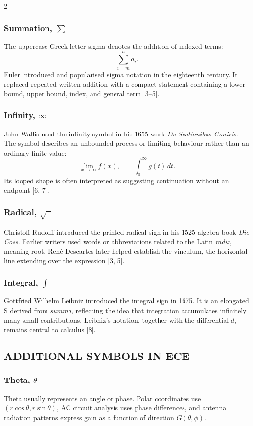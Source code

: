\begin{multicols}{2}
  \subsubsection*{Summation, $\sum$}
  The uppercase Greek letter sigma denotes the addition of indexed terms:
  \[
    \sum_{i=m}^{n}a_i.
  \]
  Euler introduced and popularised sigma notation in the eighteenth century. It replaced repeated written addition with a compact statement containing a lower bound, upper bound, index, and general term [3--5].

  \subsubsection*{Infinity, $\infty$}
  John Wallis used the infinity symbol in his 1655 work \textit{De Sectionibus Conicis}. The symbol describes an unbounded process or limiting behaviour rather than an ordinary finite value:
  \[
    \lim_{x\to\infty}f(x), \qquad
    \int_{0}^{\infty}g(t)\,dt.
  \]
  Its looped shape is often interpreted as suggesting continuation without an endpoint [6, 7].

  \subsubsection*{Radical, $\sqrt{\phantom{x}}$}
  Christoff Rudolff introduced the printed radical sign in his 1525 algebra book \textit{Die Coss}. Earlier writers used words or abbreviations related to the Latin \textit{radix}, meaning root. René Descartes later helped establish the vinculum, the horizontal line extending over the expression [3, 5].

  \subsubsection*{Integral, $\int$}
  Gottfried Wilhelm Leibniz introduced the integral sign in 1675. It is an elongated S derived from \textit{summa}, reflecting the idea that integration accumulates infinitely many small contributions.   Leibniz's notation, together with the differential $d$, remains central to calculus [8].

  \subsection*{\centering\uppercase{Additional Symbols in ECE}}

  \subsubsection*{Theta, $\theta$}
  Theta usually represents an angle or phase. Polar coordinates use $(r\cos\theta,r\sin\theta)$, AC circuit analysis uses phase differences, and antenna radiation patterns express gain as a function of direction $G(\theta,\phi)$.


\end{multicols}
